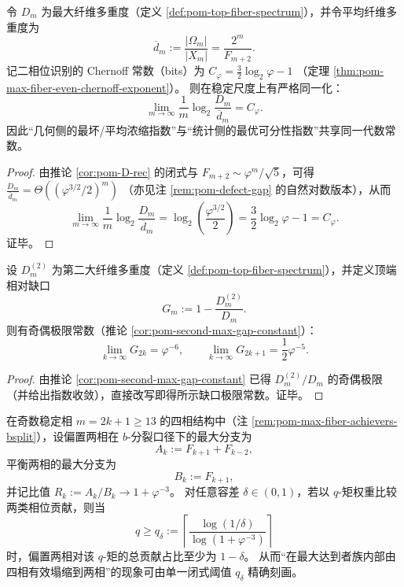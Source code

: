 \begin{corollary}[最大/平均纤维浓缩指数与二相位可分性常数的同一化]\label{cor:pom-D-over-avg-exponent-equals-chernoff}
令 \(D_m\) 为最大纤维多重度（定义 \ref{def:pom-top-fiber-spectrum}），并令平均纤维多重度为
\[
\overline d_m:=\frac{|\Omega_m|}{|X_m|}=\frac{2^m}{F_{m+2}}.
\]
记二相位识别的 Chernoff 常数（bits）为
\(
C_\varphi=\frac32\log_2\varphi-1
\)
（定理 \ref{thm:pom-max-fiber-even-chernoff-exponent}）。
则在稳定尺度上有严格同一化：
\[
\boxed{\;
\lim_{m\to\infty}\frac{1}{m}\log_2\frac{D_m}{\overline d_m}=C_\varphi.\;}
\]
因此“几何侧的最坏/平均浓缩指数”与“统计侧的最优可分性指数”共享同一代数常数。
\end{corollary}

\begin{proof}
由推论 \ref{cor:pom-D-rec} 的闭式与 \(F_{m+2}\sim \varphi^{m}/\sqrt5\)，可得
\(
\frac{D_m}{\overline d_m}
=\Theta((\varphi^{3/2}/2)^m)
\)
（亦见注 \ref{rem:pom-defect-gap} 的自然对数版本），从而
\[
\lim_{m\to\infty}\frac{1}{m}\log_2\frac{D_m}{\overline d_m}
=\log_2\!\left(\frac{\varphi^{3/2}}{2}\right)
=\frac32\log_2\varphi-1
=C_\varphi.
\]
证毕。
\end{proof}

\begin{corollary}[顶端谱缺口的奇偶极限常数]\label{cor:pom-top-gap-limit-constants}
设 \(D_m^{(2)}\) 为第二大纤维多重度（定义 \ref{def:pom-top-fiber-spectrum}），并定义顶端相对缺口
\[
G_m:=1-\frac{D_m^{(2)}}{D_m}.
\]
则有奇偶极限常数（推论 \ref{cor:pom-second-max-gap-constant}）：
\[
\boxed{\;
\lim_{k\to\infty}G_{2k}=\varphi^{-6},\qquad
\lim_{k\to\infty}G_{2k+1}=\frac{1}{2}\varphi^{-5}.\;}
\]
\end{corollary}

\begin{proof}
由推论 \ref{cor:pom-second-max-gap-constant} 已得 \(D_m^{(2)}/D_m\) 的奇偶极限（并给出指数收敛），直接改写即得所示缺口极限常数。证毕。
\end{proof}

\begin{proposition}\label{prop:pom-odd-fourphase-q-collapse-threshold}
在奇数稳定相 \(m=2k+1\ge 13\) 的四相结构中（注 \ref{rem:pom-max-fiber-achievers-bsplit}），设偏置两相在 \(b\)-分裂口径下的最大分支为
\[
A_k:=F_{k+1}+F_{k-2},
\]
平衡两相的最大分支为
\[
B_k:=F_{k+1},
\]
并记比值 \(R_k:=A_k/B_k\to 1+\varphi^{-3}\)。
对任意容差 \(\delta\in(0,1)\)，若以 \(q\)-矩权重比较两类相位贡献，则当
\[
\boxed{\;
q\ge q_\delta:=\left\lceil\frac{\log(1/\delta)}{\log(1+\varphi^{-3})}\right\rceil\;}
\]
时，偏置两相对该 \(q\)-矩的总贡献占比至少为 \(1-\delta\)。
从而“在最大达到者族内部由四相有效塌缩到两相”的现象可由单一闭式阈值 \(q_\delta\) 精确刻画。
\end{proposition}

